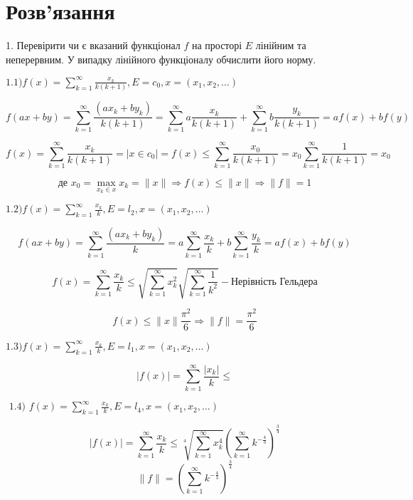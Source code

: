 \section*{Розв'язання}
\begin{tcolorbox}[title=Завдлання 1]
    1. Перевірити чи є вказаний функціонал $f$ на просторі $E$ лінійним та неперервним. У випадку лінійного функціоналу обчислити його норму.

    $
    1.1) f(x)=\sum_{k=1}^{\infty} \frac{x_{k}}{k(k+1)}, E=c_{0}, x=(x_{1}, x_{2}, \ldots) 
    $

    $$ f(ax+by) = \sum_{k=1}^{\infty} \frac{(ax_{k} + by_{k})}{k(k+1)} = 
    \sum_{k=1}^{\infty} a\frac{x_{k}}{k(k+1)} + 
    \sum_{k=1}^{\infty} b\frac{y_{k}}{k(k+1)} = af(x) + bf(y)$$

    $$ f(x) = \sum_{k=1}^{\infty}\frac{x_{k}}{k(k+1)}= |x\in c_0|= f(x) \le 
    \sum_{k=1}^{\infty}\frac{x_{0}}{k(k+1)} = x_0\sum_{k=1}^{\infty}\frac{1}{k(k+1)} 
    = x_0$$ 

    $$\text{де } x_0 = \max_{x_k \in x} x_k = \|x\| 
    \Rightarrow f(x) \le \|x\| \Rightarrow \|f\| = 1$$

    $
    1.2) f(x)=\sum_{k=1}^{\infty} \frac{x_{k}}{k}, E=l_{2}, x=(x_{1}, x_{2}, \ldots) 
    $

    $$ f(ax+by) = \sum_{k=1}^{\infty} \frac{(ax_{k} + by_{k})}{k} = 
    a \sum_{k=1}^{\infty} \frac{x_{k}}{k} + b \sum_{k=1}^{\infty} \frac{y_{k}}{k} = 
    af(x) + bf(y)$$
    
    $$f(x)= \sum_{k=1}^{\infty} \frac{x_{k}}{k} \le 
    \sqrt{\sum_{k=1}^{\infty}x_{k}^2} \sqrt{\sum_{k=1}^{\infty}\frac{1}{k^2}} - 
    \text{Нерівність Гельдера} $$

    $$f(x)\le \|x\| \frac{\pi^2}{6} \Rightarrow \|f\| = \frac{\pi^2}{6} $$

    $
    1.3) f(x)=\sum_{k=1}^{\infty} \frac{x_{k}}{k}, E=l_{1}, x=(x_{1}, x_{2}, \ldots) 
    $

    $$
    |f(x)|= \sum_{k=1}^{\infty} \frac{|x_{k}|}{k} \le  
    $$

    $
    \text { 1.4) } f(x)=\sum_{k=1}^{\infty} \frac{x_{k}}{k}, E=l_{4}, x=(x_{1}, x_{2}, \ldots) 
    $

    $$ |f(x)| = \sum_{k=1}^{\infty}\frac{x_k}{k} \le 
    \sqrt[4]{\sum_{k=1}^{\infty}x_k^4}
    (\sum_{k=1}^{\infty}k^{-\frac{4}{3}})^{\frac{3}{4}} $$
    $$\|f\|=(\sum_{k=1}^{\infty}k^{-\frac{4}{3}})^{\frac{3}{4}} $$

\end{tcolorbox}

